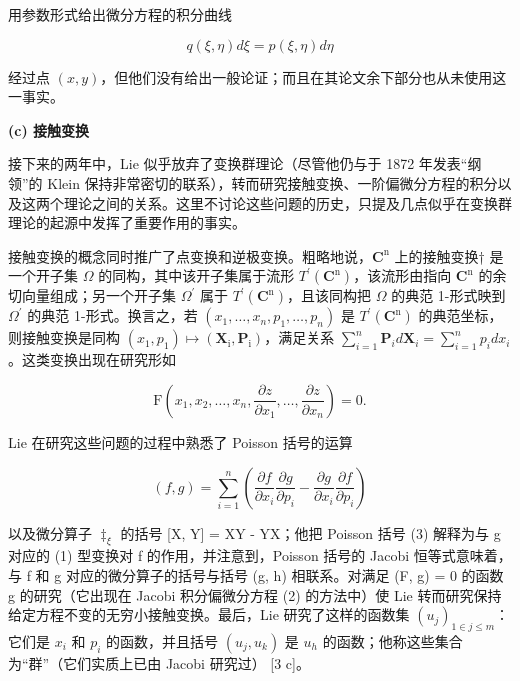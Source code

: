 用参数形式给出微分方程的积分曲线

\[
q (\xi , \eta) d \xi = p (\xi , \eta) d \eta
\]

经过点 \((x,y)\)，但他们没有给出一般论证；而且在其论文余下部分也从未使用这一事实。

\textbf{(c) 接触变换}

接下来的两年中，Lie 似乎放弃了变换群理论（尽管他仍与于 1872 年发表“纲领”的 Klein 保持非常密切的联系），转而研究接触变换、一阶偏微分方程的积分以及这两个理论之间的关系。这里不讨论这些问题的历史，只提及几点似乎在变换群理论的起源中发挥了重要作用的事实。

接触变换的概念同时推广了点变换和逆极变换。粗略地说，\(\mathbf{C}^{\mathrm{n}}\) 上的接触变换† 是一个开子集 \(\Omega\) 的同构，其中该开子集属于流形 \(T^{\prime}(\mathbf{C}^{\mathrm{n}})\)，该流形由指向 \(\mathbf{C}^{\mathrm{n}}\) 的余切向量组成；另一个开子集 \(\Omega^{\prime}\) 属于 \(T^{\prime}(\mathbf{C}^{\mathrm{n}})\)，且该同构把 \(\Omega\) 的典范 1-形式映到 \(\Omega^{\prime}\) 的典范 1-形式。换言之，若 \((x_{1},\ldots ,x_{n},p_{1},\ldots ,p_{n})\) 是 \(T^{\prime}(\mathbf{C}^{\mathrm{n}})\) 的典范坐标，则接触变换是同构 \((x_{1},p_{1})\mapsto (\mathbf{X}_{\mathrm{i}},\mathbf{P}_{\mathrm{i}})\)，满足关系 \(\sum_{i = 1}^{n}\mathbf{P}_{i}d\mathbf{X}_{i} = \sum_{i = 1}^{n}p_{i}dx_{i}\)。这类变换出现在研究形如

\[
\mathrm{F} \left(x _ {1}, x _ {2}, \dots , x _ {n}, \frac {\partial z}{\partial x _ {1}}, \dots , \frac {\partial z}{\partial x _ {n}}\right) = 0.\tag{2}
\]

Lie 在研究这些问题的过程中熟悉了 Poisson 括号的运算

\[
(f, g) = \sum_ {i = 1} ^ {n} \left(\frac {\partial f}{\partial x _ {i}} \frac {\partial g}{\partial p _ {i}} - \frac {\partial g}{\partial x _ {i}} \frac {\partial f}{\partial p _ {i}}\right)\tag{3}
\]

以及微分算子 \(\ddagger_{\xi}\) 的括号 {[}X, Y{]} = XY - YX；他把 Poisson 括号 (3) 解释为与 g 对应的 (1) 型变换对 f 的作用，并注意到，Poisson 括号的 Jacobi 恒等式意味着，与 f 和 g 对应的微分算子的括号与括号 (g, h) 相联系。对满足 (F, g) = 0 的函数 g 的研究（它出现在 Jacobi 积分偏微分方程 (2) 的方法中）使 Lie 转而研究保持给定方程不变的无穷小接触变换。最后，Lie 研究了这样的函数集 \((u_{j})_{1 \in j \leq m}\)：它们是 \(x_{i}\) 和 \(p_{i}\) 的函数，并且括号 \((u_{j}, u_{k})\) 是 \(u_{h}\) 的函数；他称这些集合为“群”（它们实质上已由 Jacobi 研究过） {[}3 c{]}。


